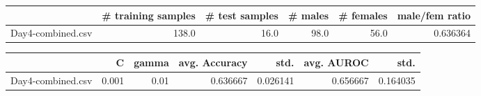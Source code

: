 \begin{tabular}{lrrrrr}
\hline
{} &  \# training samples &  \# test samples &  \# males &  \# females &  male/fem ratio \\
\hline
Day4-combined.csv &               138.0 &            16.0 &     98.0 &       56.0 &        0.636364 \\
\hline
\end{tabular}
\begin{tabular}{lrrrrrr}
\hline
{} &      C &  gamma &  avg. Accuracy &      std. &  avg. AUROC &      std. \\
\hline
Day4-combined.csv &  0.001 &   0.01 &       0.636667 &  0.026141 &    0.656667 &  0.164035 \\
\hline
\end{tabular}
